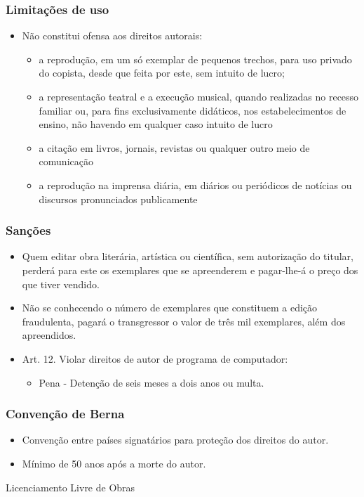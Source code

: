 \documentclass{beamer}
\begin{document}
\frame
{
	\frametitle{Limitações de uso}
	\begin{itemize}
		\item Não constitui ofensa aos direitos autorais:
		\begin{itemize}
			\item a reprodução, em um só exemplar de pequenos trechos, para uso privado do copista, desde que feita por este, sem intuito de lucro;
			\item a representação teatral e a execução musical, quando realizadas no recesso familiar ou, para fins exclusivamente didáticos, nos estabelecimentos de ensino, não havendo em qualquer caso intuito de lucro
			\item a citação em livros, jornais, revistas ou qualquer outro meio de comunicação
			\item a reprodução na imprensa diária, em diários ou periódicos de notícias ou discursos pronunciados publicamente
		\end{itemize}
	\end{itemize}
}

\frame
{
	\frametitle{Sanções}
	\begin{itemize}
		\item Quem editar obra literária, artística ou científica, sem autorização do titular, perderá para este os exemplares que se apreenderem e pagar-lhe-á o preço dos que tiver vendido.
		\item Não se conhecendo o número de exemplares que constituem a edição fraudulenta, pagará o transgressor o valor de três mil exemplares, além dos apreendidos.
		\item Art. 12. Violar direitos de autor de programa de computador:
		\begin{itemize}
			\item Pena - Detenção de seis meses a dois anos ou multa.
		\end{itemize}
	\end{itemize}
}

\frame
{
	\frametitle{Convenção de Berna}
	\begin{itemize}
		\item Convenção entre países signatários para proteção dos direitos do autor.
		\item Mínimo de 50 anos após a morte do autor.
	\end{itemize}
}

\frame
{
	\begin{center}
	Licenciamento Livre de Obras
	\end{center}
}
\end{document}
